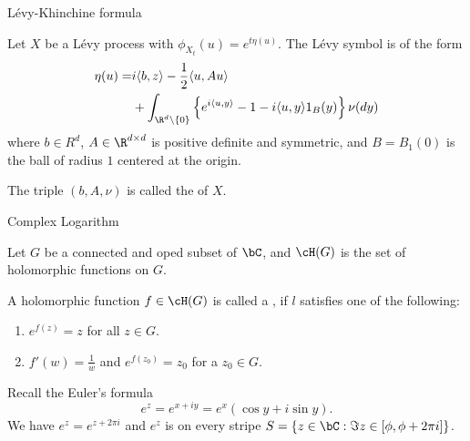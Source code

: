 \begin{frame}
    {L\'evy-Khinchine formula}
    
    Let $X$ be a L\'evy process with $\phi_{X_t}(u)= e^{t \eta(u)}$.
    The L\'evy symbol is of the form
    \begin{align*}
        \eta(u) =& i \langle b,z \rangle 
        -\frac{1}{2} \langle u, A u \rangle \\
        &+ \int_{\R^d\setminus \left\{ 0 \right\}} 
        \left\{ 
        e^{i \langle u, y \rangle} -1 - i \langle u, y \rangle 1_{B}(y) 
        \right\}
        \nu(dy)
    \end{align*}
    where $b\in R^d$, $A\in \R^{d \times d}$ is positive definite and
    symmetric, and $B=B_1(0)$ is the ball of radius $1$ centered at the origin. 
   
    The triple $(b,A, \nu)$ is called the  of $X$. 
\end{frame}


\begin{frame}
    {Complex Logarithm}
    
    Let $G$ be a connected and oped subset of $\bC$, and $\cH(G)$ is the
    set of holomorphic functions on $G$. 

    \begin{definition}
        A holomorphic function $f \in\cH(G)$ is called a , if
        $l$ satisfies one of the following:
        \begin{enumerate}
            \item $e^{f(z)}=z$ for all $z\in G$. 
            \item $f'(w)=\frac{1}{w}$ and $e^{f(z_0)}=z_0$ for a $z_0 \in G$.
        \end{enumerate}
    \end{definition}

    Recall the Euler's formula
    \begin{equation*}
        e^{z} = e^{x+iy}=e^x\left( \cos y + i \sin y \right).
    \end{equation*}
    We have $e^{z}=e^{z + 2\pi i}$ and $e^z$ is  on every stripe $S =
    \left\{ z \in \bC : \Im z \in \left[ \phi, \phi + 2\pi i \right]  \right\}$.
\end{frame}

